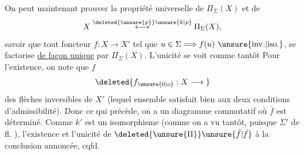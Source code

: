 On peut maintenant prouver la propriété universelle de $\Pi_\Sigma(X)$ et de
\[X\overset{\deleted{\unsure{p}}\unsure{k|p}}{\longleftrightarrow}\Pi_\Sigma(X),\]
savoir que tout foncteur $f:X\longrightarrow X'$ tel que $u\in\Sigma\Longrightarrow f(u)\ \unsure{\mathrm{inv.}|\mathrm{iso.}}$, se factorise \uline{de façon unique} par $\Pi_\Sigma(X)$. L'unicité
se voit comme tantôt Pour l'existence, on note que $f$  
\[\deleted{f_{\unsure{0|o}}:X\longrightarrow{}}\]
des flèches inversibles de $X'$ (lequel ensemble satisfait bien aux deux conditions d'admissibilité).
Donc  ce qui précède, on a un diagramme commutatif
où $\bar f$ est  déterminé. Comme $k'$ est un isomorphisme (comme on a vu tantôt, puisque $\Sigma'$  de fl. ), l'existence et l'unicité de $\deleted{\unsure{\Pi}}\unsure{\tilde f|\bar f}$  à la conclusion annoncée, cqfd.

